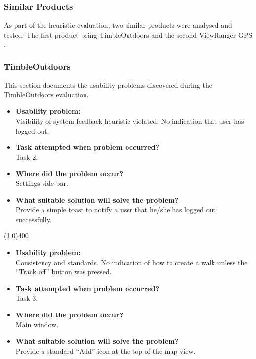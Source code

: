 \documentclass[11pt,a4paper]{article}
\begin{document}
\subsubsection{Similar Products}
As part of the heuristic evaluation, two similar products were analysed and tested. The first product being TimbleOutdoors \cite{outdoor} and the second ViewRanger GPS \cite{viewRanger}.

\subsubsection{TimbleOutdoors}

This section documents the usability problems discovered during the TimbleOutdoors evaluation.

\begin{itemize}
	\item\textbf{Usability problem: }\\
	 Visibility of system feedback heuristic violated. No indication that user has logged out.

	\item\textbf{Task attempted when problem occurred?}\\
	Task 2.

	\item\textbf{Where did the problem occur?}\\
	Settings side bar.

	\item\textbf{What suitable solution will solve the problem?}\\
	Provide a simple toast to notify a user that he/she has logged out successfully.
\end{itemize}

\line(1,0){400}

\begin{itemize}
	\item\textbf{Usability problem:}\\
	Consistency and standards. No indication of how to create a walk unless the ``Track off'' button was pressed.

	\item\textbf{Task attempted when problem occurred?}\\
	Task 3.

	\item\textbf{Where did the problem occur?}\\
	Main window.

	\item\textbf{What suitable solution will solve the problem?}\\
	Provide a standard ``Add'' icon at the top of the map view.
\end{itemize}
\end{document}
